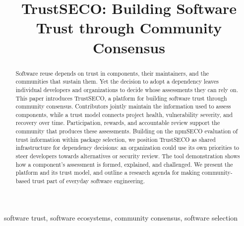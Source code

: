 \documentclass[10pt,conference]{IEEEtran}
\begin{document}
\title{TrustSECO: Building Software Trust through Community Consensus}
\author{}
\maketitle

\begin{abstract}
Software reuse depends on trust in components, their maintainers, and the communities that sustain them. Yet the decision to adopt a dependency leaves individual developers and organizations to decide whose assessments they can rely on. This paper introduces TrustSECO, a platform for building software trust through community consensus. Contributors jointly maintain the information used to assess components, while a trust model connects project health, vulnerability severity, and recovery over time. Participation, rewards, and accountable review support the community that produces these assessments. Building on the npmSECO evaluation of trust information within package selection, we position TrustSECO as shared infrastructure for dependency decisions: an organization could use its own priorities to steer developers towards alternatives or security review. The tool demonstration shows how a component's assessment is formed, explained, and challenged. We present the platform and its trust model, and outline a research agenda for making community-based trust part of everyday software engineering.
\end{abstract}

\begin{center}
\setlength{\fboxsep}{6pt}
\end{center}
\begin{IEEEkeywords}
software trust, software ecosystems, community consensus, software selection
\end{IEEEkeywords}
\end{document}
